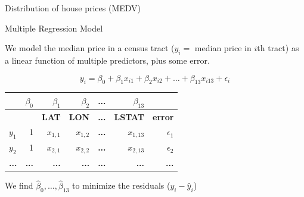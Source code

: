 \documentclass{beamer}\usepackage[]{graphicx}\usepackage[]{color}
\newenvironment{knitrout}{}{} %
\begin{document}
\begin{darkframes}
\begin{frame}[fragile]{Distribution of house prices (MEDV)}
\begin{knitrout}
\end{knitrout}
    \end{frame}


        \begin{frame}{Multiple Regression Model}

      We model the median price in a census tract ($y_i=$ median price in $i$th tract) as a linear function of multiple predictors, plus some error.

      \[
        y_i = \beta_0 + \beta_1 x_{i1} + \beta_2 x_{i2} +\ldots + \beta_{13} x_{i13} + \epsilon_i
      \]

    \begin{table}[!b]
        {\carlitoTLF %
        \begin{tabularx}{\textwidth}{Xrrrrrr}

           & $\beta_0$ & $\beta_1$ & $\beta_2$ & \textbf{...} &   $\beta_{13}$ & \\
          \toprule

          & & \textbf{LAT} & \textbf{LON} & \textbf{...} &   \textbf{LSTAT} & \textbf{error}\\
          \toprule
    $y_1$ & 1 & $x_{1,1}$ & $x_{1,2}$  & \textbf{...} & $x_{1,13}$ & $\epsilon_1$  \\
    $y_2$ & 1 & $x_{2,1}$ & $x_{2,2}$  & \textbf{...} & $x_{2,13}$ & $\epsilon_2$\\
    \textbf{...}  & \textbf{...} &  \textbf{...} & \textbf{...}  & \textbf{...} &   \textbf{...}  & \textbf{...}\\

          \bottomrule
        \end{tabularx}}

      \end{table}

      \bigskip\pause

      We find $\hat\beta_0,\ldots,\hat\beta_{13}$ to minimize the residuals ($y_i-\hat y_i$)

    \end{frame}






\end{darkframes}
\end{document}
